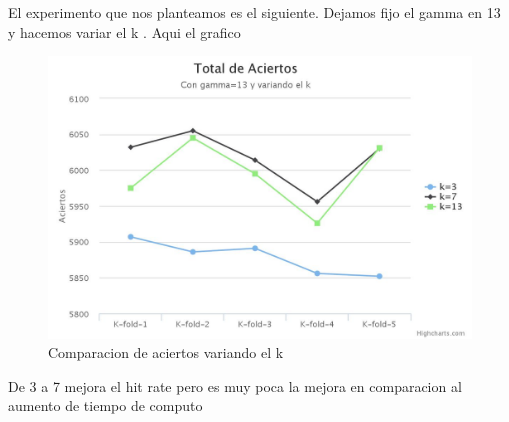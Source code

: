 El experimento que nos planteamos es el siguiente. Dejamos fijo el gamma en 13 y hacemos variar el k . Aqui el grafico  
\begin{figure}[H]
\centering
\includegraphics[width=1\textwidth]{chart(2).jpeg}
\caption{Comparacion de aciertos variando el k}
\label{fig:Comparacion de tecnicas}
\end{figure}

De 3 a 7 mejora el hit rate pero es muy poca la mejora en comparacion al aumento de tiempo de computo



